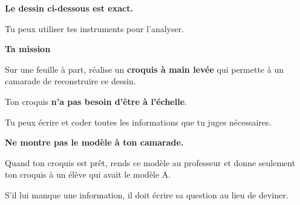 \documentclass[10pt,a4paper]{article}
\begin{document}
\begin{minipage}[t]{0.485\linewidth}

\begin{tcolorbox}[
  enhanced,
  height=14.7cm,
  colback=white,
  colframe=NeutreC!55,
  boxrule=0.7pt,
  arc=1.5mm,
  left=4mm,
  right=4mm,
  top=2mm,
  bottom=2mm,
  title={\sffamily\bfseries\color{TitreC}Modèle B},
  coltitle=TitreC,
  colbacktitle=NeutreBg
]

\begin{center}
\textbf{Le dessin ci-dessous est exact.}

\smallskip

Tu peux utiliser tes instruments pour l'analyser.
\end{center}

\vspace{0.2cm}

\begin{center}
\end{center}

\vfill

\textbf{Ta mission}

\medskip

Sur une feuille à part, réalise un \textbf{croquis à main levée}
qui permette à un camarade de reconstruire ce dessin.

\medskip

Ton croquis \textbf{n'a pas besoin d'être à l'échelle}.

\medskip

Tu peux écrire et coder toutes les informations
que tu juges nécessaires.

\medskip

\textbf{Ne montre pas le modèle à ton camarade.}

\vspace{0.3cm}

Quand ton croquis est prêt, rends ce modèle au professeur
et donne seulement ton croquis à un élève qui avait le modèle A.

\medskip

S'il lui manque une information,
il doit écrire sa question au lieu de deviner.

\end{tcolorbox}

\end{minipage}
\end{document}
